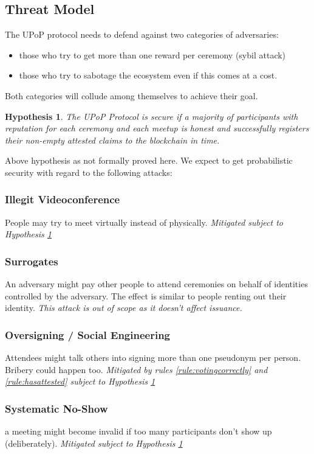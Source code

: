 \documentclass[conference]{IEEEtran}
\newtheorem{hypothesis}{Hypothesis}
\begin{document}
\subsection{Threat Model}
The \encointer UPoP protocol needs to defend against two categories of adversaries:
\begin{itemize}
	\item those who try to get more than one reward per ceremony (sybil attack)
	\item those who try to sabotage the \encointer ecosystem even if this comes at a cost.
\end{itemize}
Both categories will collude among themselves to achieve their goal.

\begin{hypothesis}\label{hypothesis:secureifmajorityhonest}
	The \encointer UPoP Protocol is secure if a majority of participants with reputation for each ceremony and each meetup is honest and successfully registers their non-empty attested claims to the blockchain in time. 
\end{hypothesis}

Above hypothesis as not formally proved here. We expect to get probabilistic security with regard to the following attacks:

\subsubsection{Illegit Videoconference}
People may try to meet virtually instead of physically. \emph{Mitigated subject to Hypothesis \ref{hypothesis:secureifmajorityhonest}}
\subsubsection{Surrogates}
An adversary might pay other people to attend ceremonies on behalf of identities controlled by the adversary. The effect is similar to people renting out their identity. \emph{This attack is out of scope as it doesn't affect issuance.}
\subsubsection{Oversigning / Social Engineering}
Attendees might talk others into signing more than one pseudonym per person. Bribery could happen too. \emph{Mitigated by rules \ref{rule:votingcorrectly} and \ref{rule:hasattested} subject to Hypothesis \ref{hypothesis:secureifmajorityhonest}}
\subsubsection{Systematic No-Show}
a meeting might become invalid if too many participants don't show up (deliberately). \emph{Mitigated subject to Hypothesis \ref{hypothesis:secureifmajorityhonest}} 
\end{document}
